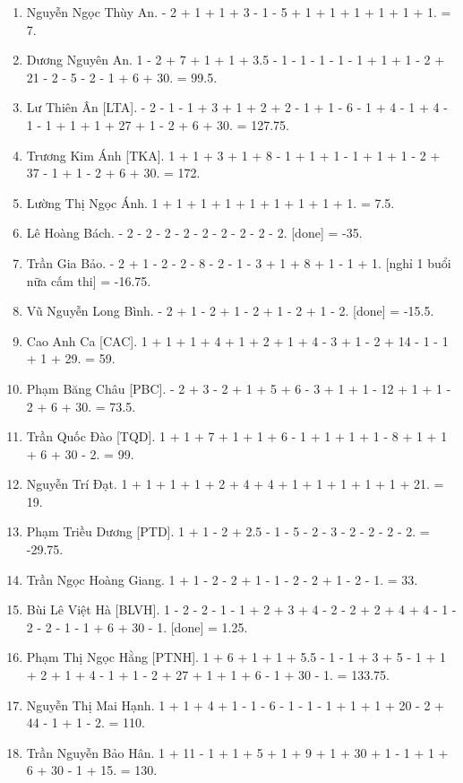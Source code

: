 \documentclass{article}
\begin{document}
\begin{enumerate}
	\item {\sc Nguyễn Ngọc Thùy An.} - 2 + 1 + 1 + 3 - 1 - 5 + 1 + 1 + 1 + 1 + 1 + 1. = 7.
	\item {\sc Dương Nguyên An.} 1 - 2 + 7 + 1 + 1 + 3.5 - 1 - 1 - 1 - 1 - 1 + 1 + 1 - 2 + 21 - 2 - 5 - 2 - 1 + 6 + 30. = 99.5.
	\item {\sc Lư Thiên Ân [LTA].} - 2 - 1 - 1 + 3 + 1 + 2 + 2 - 1 + 1 - 6 - 1 + 4 - 1 + 4 - 1 - 1 + 1 + 1 + 27 + 1 - 2 + 6 + 30. = 127.75.
	\item {\sc Trương Kim Ánh [TKA].} 1 + 1 + 3 + 1 + 8 - 1 + 1 + 1 - 1 + 1 + 1 - 2 + 37 - 1 + 1 - 2 + 6 + 30. = 172.
	\item {\sc Lường Thị Ngọc Ánh.} 1 + 1 + 1 + 1 + 1 + 1 + 1 + 1 + 1. = 7.5.
	\item {\sc Lê Hoàng Bách.} - 2 - 2 - 2 - 2 - 2 - 2 - 2 - 2 - 2. [done] = -35.
	\item {\sc Trần Gia Bảo.} - 2 + 1 - 2 - 2 - 8 - 2 - 1 - 3 + 1 + 8 + 1 - 1 + 1. [nghỉ 1 buổi nữa cấm thi] = -16.75.
	\item {\sc Vũ Nguyễn Long Bình.} - 2 + 1 - 2 + 1 - 2 + 1 - 2 + 1 - 2. [done] = -15.5.
	\item {\sc Cao Anh Ca [CAC].} 1 + 1 + 1 + 4 + 1 + 2 + 1 + 4 - 3 + 1 - 2 + 14 - 1 - 1 + 1 + 29. = 59.
	\item {\sc Phạm Băng Châu [PBC].} - 2 + 3 - 2 + 1 + 5 + 6 - 3 + 1 + 1 - 12 + 1 + 1 - 2 + 6 + 30. = 73.5.
	\item {\sc Trần Quốc Đào [TQD].} 1 + 1 + 7 + 1 + 1 + 6 - 1 + 1 + 1 + 1 - 8 + 1 + 1 + 6 + 30 - 2. = 99.
	\item {\sc Nguyễn Trí Đạt.} 1 + 1 + 1 + 1 + 2 + 4 + 4 + 1 + 1 + 1 + 1 + 1 + 21. = 19.
	\item {\sc Phạm Triều Dương [PTD].} 1 + 1 - 2 + 2.5 - 1 - 5 - 2 - 3 - 2 - 2 - 2 - 2. = -29.75.
	\item {\sc Trần Ngọc Hoàng Giang.} 1 + 1 - 2 - 2 + 1 - 1 - 2 - 2 + 1 - 2 - 1. = 33.
	\item {\sc Bùi Lê Việt Hà [BLVH].} 1 - 2 - 2 - 1 - 1 + 2 + 3 + 4 - 2 - 2 + 2 + 4 + 4 - 1 - 2 - 2 - 1 - 1 + 6 + 30 - 1. [done] = 1.25.
	\item {\sc Phạm Thị Ngọc Hằng [PTNH].} 1 + 6 + 1 + 1 + 5.5 - 1 - 1 + 3 + 5 - 1 + 1 + 2 + 1 + 4 - 1 + 1 - 2 + 27 + 1 + 1 + 6 - 1 + 30 - 1. = 133.75.
	\item {\sc Nguyễn Thị Mai Hạnh.} 1 + 1 + 4 + 1 - 1 - 6 - 1 - 1 - 1 + 1 + 1 + 20 - 2 + 44 - 1 + 1 - 2. = 110.
	\item {\sc Trần Nguyễn Bảo Hân.} 1 + 11 - 1 + 1 + 5 + 1 + 9 + 1 + 30 + 1 - 1 + 1 + 6 + 30 - 1 + 15. = 130.

\end{enumerate}
\end{document}
